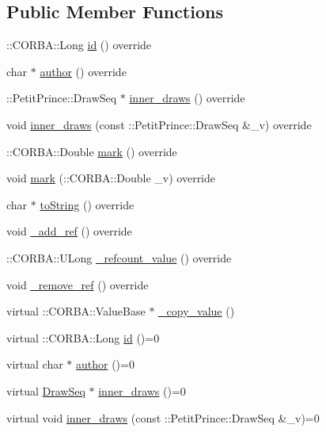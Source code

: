 \subsection*{Public Member Functions}
\begin{DoxyCompactItemize}
\item 
\+::C\+O\+R\+B\+A\+::\+Long \hyperlink{class_draw_a1bf27c5a59da9002d55936c947dce2cc}{id} () override
\item 
char $\ast$ \hyperlink{class_draw_a4781c654db63e069c8c5be017f6ccc34}{author} () override
\item 
\+::Petit\+Prince\+::\+Draw\+Seq $\ast$ \hyperlink{class_draw_ab51be1cb17bd03a3c8aba343e3d45013}{inner\+\_\+draws} () override
\item 
void \hyperlink{class_draw_a7ff3025eb06561c0c16ffbe2745b2315}{inner\+\_\+draws} (const \+::Petit\+Prince\+::\+Draw\+Seq \&\+\_\+v) override
\item 
\+::C\+O\+R\+B\+A\+::\+Double \hyperlink{class_draw_aeee0f92e6a2835212a7f3e44e4e41227}{mark} () override
\item 
void \hyperlink{class_draw_ac7ea79d2a2efff6c6b3ce9efeaf67a45}{mark} (\+::C\+O\+R\+B\+A\+::\+Double \+\_\+v) override
\item 
char $\ast$ \hyperlink{class_draw_a997583b775c33f224af795ab367cc400}{to\+String} () override
\item 
void \hyperlink{class_draw_a16806f06fc905a991a57921f20f7601f}{\+\_\+add\+\_\+ref} () override
\item 
\+::C\+O\+R\+B\+A\+::\+U\+Long \hyperlink{class_draw_ad420e80c785e510210fc7b8f3765d366}{\+\_\+refcount\+\_\+value} () override
\item 
void \hyperlink{class_draw_a7d465e9c8109a47928acf9d4b8f3204c}{\+\_\+remove\+\_\+ref} () override
\item 
virtual \+::C\+O\+R\+B\+A\+::\+Value\+Base $\ast$ \hyperlink{class_draw_a833b3c7cd298f64e57e2d91644c1fba0}{\+\_\+copy\+\_\+value} ()
\item 
virtual \+::C\+O\+R\+B\+A\+::\+Long \hyperlink{class_draw_a50509da989141b00a5ae22d68a4d5856}{id} ()=0
\item 
virtual char $\ast$ \hyperlink{class_draw_a4a1145eee8c06df2d81c99ad3ed40237}{author} ()=0
\item 
virtual \hyperlink{class_draw_seq}{Draw\+Seq} $\ast$ \hyperlink{class_draw_a8dfc05b32e3879efeb3b497abed032e8}{inner\+\_\+draws} ()=0
\item 
virtual void \hyperlink{class_draw_ae1c94fbdfc84aed1996ef1cdb9495076}{inner\+\_\+draws} (const \+::Petit\+Prince\+::\+Draw\+Seq \&\+\_\+v)=0

\end{DoxyCompactItemize}
